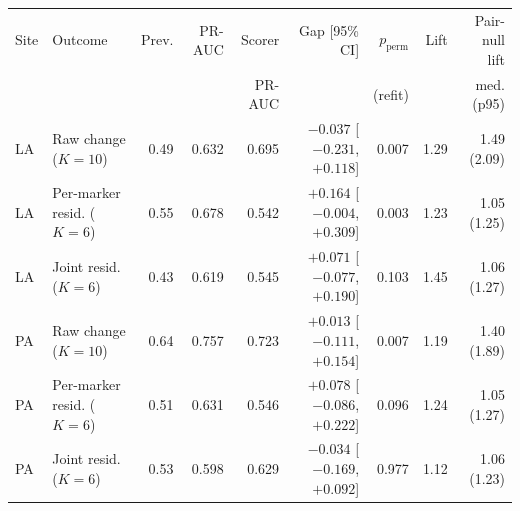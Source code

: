 \begin{tabular}{llrrrrrrr}
\toprule
Site & Outcome & Prev. & PR-AUC & Scorer & Gap [95\% CI] & $p_{\mathrm{perm}}$ & Lift & Pair-null lift \\
 & & & & PR-AUC & & (refit) & & med. (p95) \\
\midrule
LA & Raw change ($K{=}10$) & 0.49 & 0.632 & 0.695 & $-0.037$ [$-0.231$, $+0.118$] & 0.007 & 1.29 & 1.49 (2.09) \\
LA & Per-marker resid. ($K{=}6$) & 0.55 & 0.678 & 0.542 & $+0.164$ [$-0.004$, $+0.309$] & 0.003 & 1.23 & 1.05 (1.25) \\
LA & Joint resid. ($K{=}6$) & 0.43 & 0.619 & 0.545 & $+0.071$ [$-0.077$, $+0.190$] & 0.103 & 1.45 & 1.06 (1.27) \\
\midrule
PA & Raw change ($K{=}10$) & 0.64 & 0.757 & 0.723 & $+0.013$ [$-0.111$, $+0.154$] & 0.007 & 1.19 & 1.40 (1.89) \\
PA & Per-marker resid. ($K{=}6$) & 0.51 & 0.631 & 0.546 & $+0.078$ [$-0.086$, $+0.222$] & 0.096 & 1.24 & 1.05 (1.27) \\
PA & Joint resid. ($K{=}6$) & 0.53 & 0.598 & 0.629 & $-0.034$ [$-0.169$, $+0.092$] & 0.977 & 1.12 & 1.06 (1.23) \\
\bottomrule
\end{tabular}
